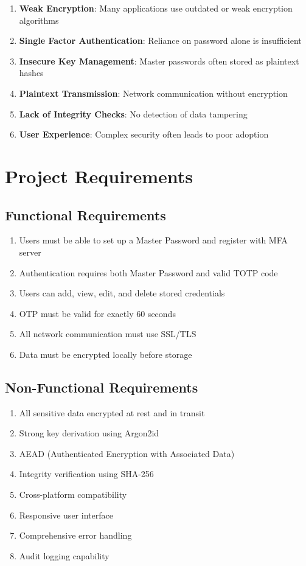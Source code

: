 \documentclass[12pt,a4paper]{report}
\begin{document}
\begin{enumerate}
    \item \textbf{Weak Encryption}: Many applications use outdated or weak encryption algorithms
    \item \textbf{Single Factor Authentication}: Reliance on password alone is insufficient
    \item \textbf{Insecure Key Management}: Master passwords often stored as plaintext hashes
    \item \textbf{Plaintext Transmission}: Network communication without encryption
    \item \textbf{Lack of Integrity Checks}: No detection of data tampering
    \item \textbf{User Experience}: Complex security often leads to poor adoption
\end{enumerate}

\section{Project Requirements}

\subsection{Functional Requirements}

\begin{enumerate}
    \item Users must be able to set up a Master Password and register with MFA server
    \item Authentication requires both Master Password and valid TOTP code
    \item Users can add, view, edit, and delete stored credentials
    \item OTP must be valid for exactly 60 seconds
    \item All network communication must use SSL/TLS
    \item Data must be encrypted locally before storage
\end{enumerate}

\subsection{Non-Functional Requirements}

\begin{enumerate}
    \item All sensitive data encrypted at rest and in transit
    \item Strong key derivation using Argon2id
    \item AEAD (Authenticated Encryption with Associated Data)
    \item Integrity verification using SHA-256
    \item Cross-platform compatibility
    \item Responsive user interface
    \item Comprehensive error handling
    \item Audit logging capability
\end{enumerate}
\end{document}
